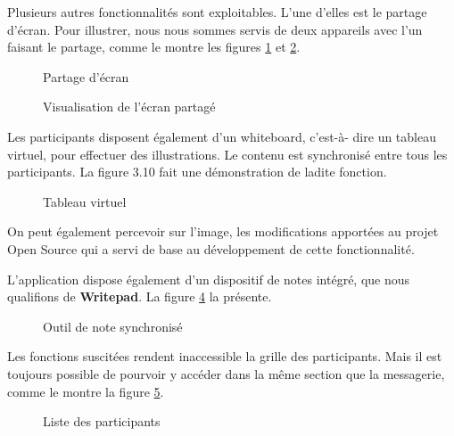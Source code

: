 Plusieurs autres fonctionnalités sont exploitables. 
L’une d’elles est le partage d'écran. Pour illustrer, nous nous sommes servis de deux appareils avec 
l’un faisant le partage, comme le montre les figures \ref{fig:sharing_screen} et \ref{fig:viewing_screen}.

\newpage
\begin{figure}[h]
  \centering
  \caption{Partage d'écran}
  \label{fig:sharing_screen}
\end{figure}

\newpage
\begin{figure}[h]
  \centering
  \caption{Visualisation de l'écran partagé}
  \label{fig:viewing_screen}
\end{figure}

Les participants disposent également d’un whiteboard, 
c'est-à- dire un tableau virtuel, pour effectuer des illustrations. 
Le contenu est synchronisé entre tous les participants. 
La figure 3.10 fait une démonstration de ladite fonction.

\begin{figure}[h]
  \centering
  \caption{Tableau virtuel}
  \label{fig:whiteboard}
\end{figure}

On peut également percevoir sur l’image, les modifications apportées au projet Open Source qui a servi de base au développement de cette fonctionnalité.

L’application dispose également d’un dispositif de notes intégré, que nous qualifions de \textbf{Writepad}. La figure \ref{fig:writepad} la présente.


\begin{figure}[h]
  \centering
  \caption{Outil de note synchronisé}
  \label{fig:writepad}
\end{figure}

Les fonctions suscitées rendent inaccessible la grille des participants. 
Mais il est toujours possible de pourvoir y accéder dans la même section que la messagerie, comme le montre la figure \ref{fig:participants_aside}.


\begin{figure}[h]
  \centering
  \caption{Liste des participants}
  \label{fig:participants_aside}
\end{figure}


